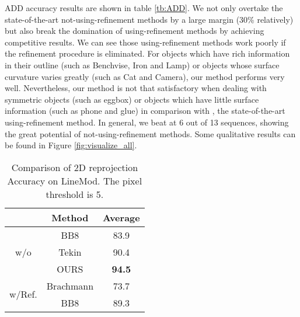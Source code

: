\documentclass[10pt,twocolumn,letterpaper]{article}
\begin{document}
ADD accuracy results are shown in table \ref{tb:ADD}. We not only overtake the state-of-the-art not-using-refinement methods by a large margin (30\% relatively) but also break the domination of using-refinement methods by achieving competitive results. We can see those using-refinement methods work poorly if the refinement procedure is eliminated. For objects which have rich information in their outline (such as Benchvise, Iron and Lamp) or objects whose surface curvature varies greatly (such as Cat and Camera), our method performs very well. Nevertheless, our method is not that satisfactory when dealing with symmetric objects (such as eggbox) or objects which have little surface information (such as phone and glue) in comparison with \cite{Kehl2017SSD6DMR}, the state-of-the-art using-refinement method. In general, we beat \cite{Kehl2017SSD6DMR} at 6 out of 13 sequences, showing the great potential of not-using-refinement methods. Some qualitative results can be found in Figure \ref{fig:visualize_all}.

\begin{table}[t]
\begin{center}
\begin{tabular}{|c|c|c|}
\hline
                        & Method    & Average       \\ \hline
\multirow{3}{*}{w/o}    & BB8 \cite{Rad2017BB8AS}       & 83.9          \\ \cline{2-3}
                        & Tekin \cite{tekin18} & 90.4          \\ \cline{2-3}
                        & OURS      & \textbf{94.5} \\ \hline
\multirow{2}{*}{w/Ref.} & Brachmann \cite{7780735} & 73.7          \\ \cline{2-3}
                        & BB8 \cite{Rad2017BB8AS}       & 89.3          \\ \hline

\end{tabular}
\end{center}
\caption{Comparison of 2D reprojection Accuracy on LineMod. The pixel threshold is 5.}
\label{tb:reprojection_accuracy}
\end{table}
\end{document}
